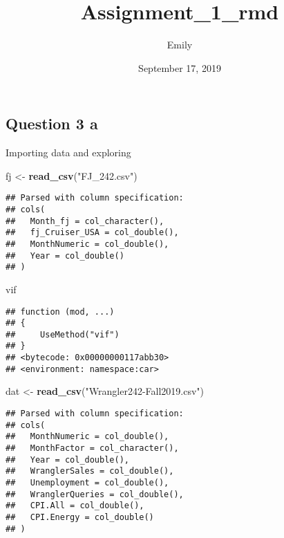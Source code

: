 \documentclass[]{article}
\title{Assignment\_1\_rmd}
\author{Emily}
\date{September 17, 2019}
\newenvironment{Shaded}{\begin{snugshade}}{\end{snugshade}}
\newcommand{\KeywordTok}[1]{\textcolor[rgb]{0.13,0.29,0.53}{\textbf{#1}}}
\newcommand{\StringTok}[1]{\textcolor[rgb]{0.31,0.60,0.02}{#1}}
\newcommand{\NormalTok}[1]{#1}
\begin{document}
\maketitle

\subsection{Question 3 a}\label{question-3-a}

Importing data and exploring

\begin{Shaded}
\begin{Highlighting}[]
\NormalTok{fj <-}\StringTok{ }\KeywordTok{read_csv}\NormalTok{(}\StringTok{"FJ_242.csv"}\NormalTok{)}
\end{Highlighting}
\end{Shaded}

\begin{verbatim}
## Parsed with column specification:
## cols(
##   Month_fj = col_character(),
##   fj_Cruiser_USA = col_double(),
##   MonthNumeric = col_double(),
##   Year = col_double()
## )
\end{verbatim}

\begin{Shaded}
\begin{Highlighting}[]
\NormalTok{vif}
\end{Highlighting}
\end{Shaded}

\begin{verbatim}
## function (mod, ...) 
## {
##     UseMethod("vif")
## }
## <bytecode: 0x00000000117abb30>
## <environment: namespace:car>
\end{verbatim}

\begin{Shaded}
\begin{Highlighting}[]
\NormalTok{dat <-}\StringTok{ }\KeywordTok{read_csv}\NormalTok{(}\StringTok{"Wrangler242-Fall2019.csv"}\NormalTok{)}
\end{Highlighting}
\end{Shaded}

\begin{verbatim}
## Parsed with column specification:
## cols(
##   MonthNumeric = col_double(),
##   MonthFactor = col_character(),
##   Year = col_double(),
##   WranglerSales = col_double(),
##   Unemployment = col_double(),
##   WranglerQueries = col_double(),
##   CPI.All = col_double(),
##   CPI.Energy = col_double()
## )
\end{verbatim}
\end{document}
